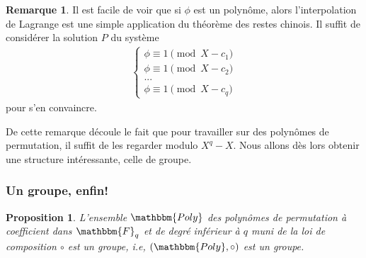 \documentclass[12pt]{article}
\newcommand{\Fq}{\mathbbm{F}_q}
\newtheorem{prop}{Proposition}
\theoremstyle{definition}
\newtheorem{rem}{Remarque}
\begin{document}
\begin{rem}
Il est facile de voir que si $\phi $ est un polynôme, alors l'interpolation de Lagrange est une simple application du théorème des restes chinois. \newline
Il suffit de considérer la solution $P$ du système
	\begin{align*}
		\begin{cases}
			\phi \equiv 1 \pmod{X - c_1} \\
			\phi \equiv 1 \pmod{X - c_2} \\
			... \\
			\phi \equiv 1 \pmod{X - c_q}
  		\end{cases}
	\end{align*}
pour s'en convaincre.
\end{rem}

De cette remarque découle le fait que pour travailler sur des polynômes de permutation, il suffit de les regarder modulo $X^q - X$. Nous allons dès lors obtenir une structure intéressante, celle de groupe.

\subsubsection{Un groupe, enfin!} 

\begin{prop}
L'ensemble $\mathbbm{Poly}$ des polynômes de permutation  à coefficient dans $\Fq$ et de degré inférieur à $q$ muni de la loi de composition $\circ$ est un groupe, i.e, $(\mathbbm{Poly}, \circ)$ est un groupe.
\end{prop}
\end{document}
